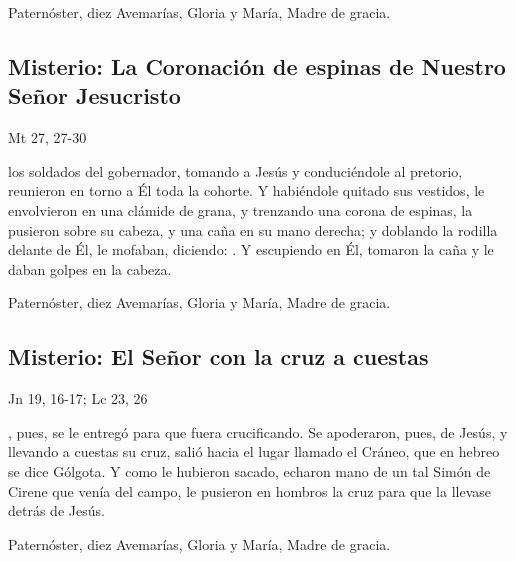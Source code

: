 \documentclass[10pt,a4paper,oneside]{book}
\newcounter{sorrowful-counter}
\begin{document}
\begin{center}
      Paternóster, diez Avemarías, Gloria y María, Madre de gracia.
\end{center}

\subsection*{ Misterio: La Coronación de espinas de Nuestro Señor Jesucristo}
\begin{flushright}
      {\color{red}Mt 27, 27-30}
\end{flushright}
 los soldados del gobernador, tomando a Jesús y conduciéndole al pretorio, reunieron en torno a Él toda la cohorte. Y habiéndole quitado sus vestidos,
le envolvieron en una clámide de grana, y trenzando una corona de espinas, la pusieron sobre su cabeza, y una caña en su mano derecha; y doblando la rodilla delante de Él,
le mofaban, diciendo: . Y escupiendo en Él, tomaron la caña y le daban golpes en la cabeza.

\begin{center}
      Paternóster, diez Avemarías, Gloria y María, Madre de gracia.
\end{center}

\subsection*{ Misterio: El Señor con la cruz a cuestas}
\begin{flushright}
      {\color{red}Jn 19, 16-17; Lc 23, 26}
\end{flushright}
, pues, se le entregó para que fuera crucificando. Se apoderaron, pues, de Jesús, y llevando a cuestas su cruz, salió hacia el lugar llamado el Cráneo,
que en hebreo se dice Gólgota. Y como le hubieron sacado, echaron mano de un tal Simón de Cirene que venía del campo, le pusieron en hombros la cruz para que la llevase detrás de Jesús.

\begin{center}
      Paternóster, diez Avemarías, Gloria y María, Madre de gracia.
\end{center}

\end{document}
